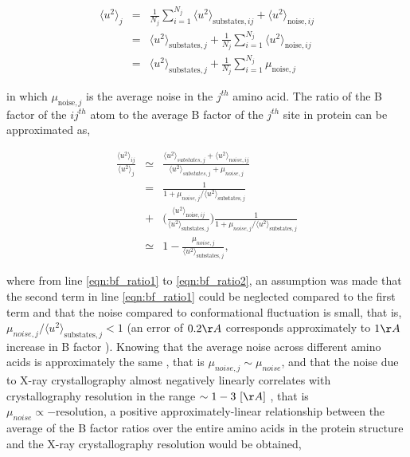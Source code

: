 \documentclass[11pt]{article}
\begin{document}
    \begin{eqnarray}
        \label{eqn:bf_avg}
        \langle u^2 \rangle_{j} &=& \frac{1}{N_j} \sum_{i=1}^{N_j} \langle u^2 \rangle_{\text{substates},ij} + \langle u^2 \rangle_{\text{noise},ij} \nonumber \\
                                &=& \langle u^2 \rangle_{\text{substates},j} + \frac{1}{N_j} \sum_{i=1}^{N_j} \langle u^2 \rangle_{\text{noise},ij} \nonumber \\
                                &=& \langle u^2 \rangle_{\text{substates},j} + \frac{1}{N_j} \sum_{i=1}^{N_j} \mu_{\text{noise},j}
    \end {eqnarray}

    \noindent in which $\mu_{\text{noise},j}$ is the average noise in the $j^{th}$ amino acid. The ratio of the B factor of the $ij^{th}$ atom to the average B factor of the $j^{th}$ site in protein can be approximated as,

    \begin{eqnarray}
        \label{eqn:bf_ratio}
        \frac{\langle u^2 \rangle_{ij}}{\langle u^2 \rangle_{j}} &\simeq& \frac{\langle u^2 \rangle_{substates,j} + \langle u^2 \rangle_{noise,ij}}{\langle u^2 \rangle_{substates,j} + \mu_{noise,j}} \\
                                 &=& \frac{1}{1 + \mu_{noise,j} / \langle u^2 \rangle_{\text{substates},j}} \nonumber \\
                                 &+& \bigg(\frac{\langle u^2 \rangle_{\text{noise},ij}}{\langle u^2 \rangle_{\text{substates},j}} \bigg)
                                 \frac{1}{1 + \mu_{noise,j} / \langle u^2 \rangle_{\text{substates},j}} \label{eqn:bf_ratio1} \\
                                 &\simeq& 1 - \frac{\mu_{noise,j}}{\langle u^2 \rangle_{\text{substates},j}}, \label{eqn:bf_ratio2}
    \end {eqnarray}

    \noindent where from line \ref{eqn:bf_ratio1} to \ref{eqn:bf_ratio2}, an assumption was made that the second term in line \ref{eqn:bf_ratio1} could be neglected compared to the first term and that the noise compared to conformational fluctuation is small, that is, $\mu_{noise,j} / \langle u^2 \rangle_{\text{substates},j} < 1$ (an error of $0.2\AA$ corresponds approximately to $1\AA$ increase in B factor \cite{read_structure-factor_1990}). Knowing that the average noise across different amino acids is approximately the same \cite{frauenfelder_temperature-dependent_1979}, that is $\mu_{noise,j}\sim \mu_{noise}$, and that the noise due to X-ray crystallography almost negatively linearly correlates with crystallography resolution in the range $\sim1-3~[\AA]$ \cite{read_structure-factor_1990}, that is $\mu_{noise}\propto -\text{resolution}$, a positive approximately-linear relationship between the average of the B factor ratios over the entire amino acids in the protein structure and the X-ray crystallography resolution would be obtained,
\end{document}
